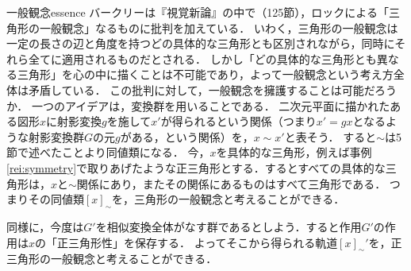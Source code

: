 \documentclass[11pt,a4paper, dvipdfmx]{jsarticle}
\begin{document}
\begin{rei}{一般観念}{essence}
バークリーは『視覚新論』の中で（125節），ロックによる「三角形の一般観念」なるものに批判を加えている．
いわく，三角形の一般観念は一定の長さの辺と角度を持つどの具体的な三角形とも区別されながら，同時にそれら全てに適用されるものだとされる．
しかし「どの具体的な三角形とも異なる三角形」を心の中に描くことは不可能であり，よって一般観念という考え方全体は矛盾している．
この批判に対して，一般観念を擁護することは可能だろうか．
一つのアイデアは，変換群を用いることである．
二次元平面に描かれたある図形$x$に射影変換$g$を施して$x'$が得られるという関係（つまり$x' = gx$となるような射影変換群$G$の元$g$がある，という関係）を，$x \sim x'$と表そう．
すると$\sim$は5節で述べたことより同値類になる．
今，$x$を具体的な三角形，例えば事例\ref{rei:symmetry}で取りあげたような正三角形とする．するとすべての具体的な三角形は，$x$と$\sim$関係にあり，またその関係にあるものはすべて三角形である．
つまりその同値類$[x]_\sim$を，三角形の一般観念と考えることができる．

同様に，今度は$G'$を相似変換全体がなす群であるとしよう．すると作用$G'$の作用は$x$の「正三角形性」を保存する．
よってそこから得られる軌道$[x]_\sim'$を，正三角形の一般観念と考えることができる．
\end{rei}


 
\end{document}
